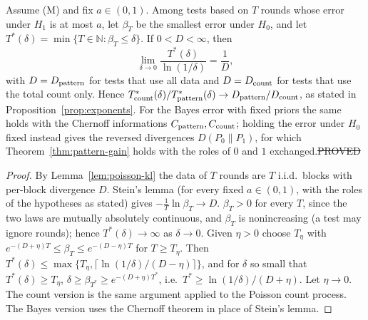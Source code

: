 \begin{theorem}\label{thm:stein-rounds}
Assume (M) and fix $a\in(0,1)$. Among tests based on $T$ rounds whose error under $H_1$ is at most $a$, let $\beta_T$ be the smallest error under $H_0$, and let $T^\ast(\delta)=\min\{T\in\mathbb N:\beta_T\le\delta\}$. If $0<D<\infty$, then
\[
\lim_{\delta\to0}\frac{T^\ast(\delta)}{\ln(1/\delta)}=\frac1D,
\]
with $D=D_{\rm pattern}$ for tests that use all data and $D=D_{\rm count}$ for tests that use the total count only. Hence $T^\ast_{\rm count}(\delta)/T^\ast_{\rm pattern}(\delta)\to D_{\rm pattern}/D_{\rm count}$, as stated in Proposition~\ref{prop:exponents}.
For the Bayes error with fixed priors the same holds with the Chernoff informations $C_{\rm pattern},C_{\rm count}$; holding the error under $H_0$ fixed instead gives the reversed divergences $D(P_0\|P_1)$, for which Theorem~\ref{thm:pattern-gain} holds with the roles of $0$ and $1$ exchanged.\hfill\st{PROVED}
\end{theorem}
\begin{proof}
By Lemma~\ref{lem:poisson-kl} the data of $T$ rounds are $T$ i.i.d.\ blocks with per-block divergence $D$. Stein's lemma \cite[Thm.~11.8.3]{CT} (for every fixed $a\in(0,1)$, with the roles of the hypotheses as stated) gives $-\tfrac1T\ln\beta_T\to D$.
$\beta_T>0$ for every $T$, since the two laws are mutually absolutely continuous, and $\beta_T$ is nonincreasing (a test may ignore rounds); hence $T^\ast(\delta)\to\infty$ as $\delta\to0$.
Given $\eta>0$ choose $T_\eta$ with $e^{-(D+\eta)T}\le\beta_T\le e^{-(D-\eta)T}$ for $T\ge T_\eta$. Then $T^\ast(\delta)\le\max\{T_\eta,\lceil\ln(1/\delta)/(D-\eta)\rceil\}$, and for $\delta$ so small that $T^\ast(\delta)\ge T_\eta$, $\delta\ge\beta_{T^\ast}\ge e^{-(D+\eta)T^\ast}$, i.e.\ $T^\ast\ge\ln(1/\delta)/(D+\eta)$. Let $\eta\to0$.
The count version is the same argument applied to the Poisson count process. The Bayes version uses the Chernoff theorem \cite[Thm.~11.9.1]{CT} in place of Stein's lemma.
\end{proof}


